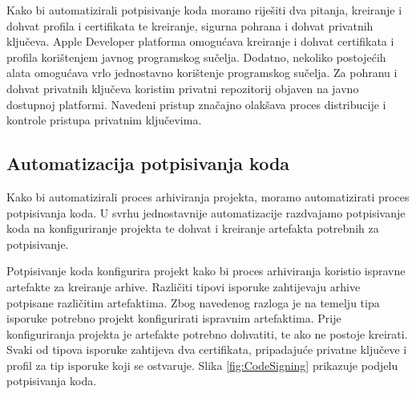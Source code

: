\documentclass[times, utf8, diplomski, numeric]{fer}
\begin{document}
Kako bi automatizirali potpisivanje koda moramo riješiti dva pitanja, kreiranje i dohvat profila i certifikata te kreiranje, sigurna pohrana i dohvat privatnih ključeva. Apple Developer platforma omogućava kreiranje i dohvat certifikata i profila korištenjem javnog programskog sučelja. Dodatno, nekoliko postojećih alata omogućava vrlo jednostavno korištenje programskog sučelja. Za pohranu i dohvat privatnih ključeva koristim privatni repozitorij objaven na javno dostupnoj platformi. Navedeni pristup značajno olakšava proces distribucije i kontrole pristupa privatnim ključevima.

\subsection{Automatizacija potpisivanja koda}

Kako bi automatizirali proces arhiviranja projekta, moramo automatizirati proces potpisivanja koda. U svrhu jednostavnije automatizacije razdvajamo potpisivanje koda na konfiguriranje projekta te dohvat i kreiranje artefakta potrebnih za potpisivanje.

Potpisivanje koda konfigurira projekt kako bi proces arhiviranja koristio ispravne artefakte za kreiranje arhive. Različiti tipovi isporuke zahtijevaju arhive potpisane različitim artefaktima. Zbog navedenog razloga je na temelju tipa isporuke potrebno projekt konfigurirati ispravnim artefaktima. Prije konfiguriranja projekta je artefakte potrebno dohvatiti, te ako ne postoje kreirati. Svaki od tipova isporuke zahtijeva dva certifikata, pripadajuće privatne ključeve i profil za tip isporuke koji se ostvaruje. Slika \ref{fig:CodeSigning} prikazuje podjelu potpisivanja koda.
\end{document}
